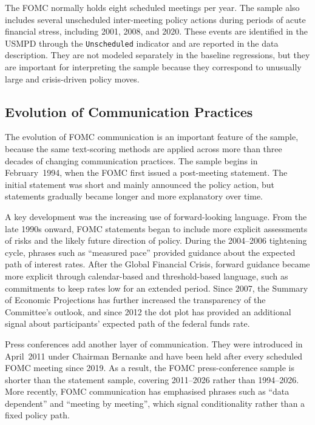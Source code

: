 The FOMC normally holds eight scheduled meetings per year. The sample
also includes several unscheduled inter-meeting policy actions during
periods of acute financial stress, including 2001, 2008, and 2020. These
events are identified in the USMPD through the \texttt{Unscheduled}
indicator and are reported in the data description. They are not modeled
separately in the baseline regressions, but they are important for
interpreting the sample because they correspond to unusually large and
crisis-driven policy moves.

\subsection{Evolution of Communication Practices}
\label{sec:inst_fomc_evolution}

The evolution of FOMC communication is an important feature of the
sample, because the same text-scoring methods are applied across more
than three decades of changing communication practices. The sample begins
in February~1994, when the FOMC first issued a post-meeting statement.
The initial statement was short and mainly announced the policy action,
but statements gradually became longer and more explanatory over time.

A key development was the increasing use of forward-looking language.
From the late 1990s onward, FOMC statements began to include more
explicit assessments of risks and the likely future direction of policy.
During the 2004--2006 tightening cycle, phrases such as ``measured
pace'' provided guidance about the expected path of interest rates. After
the Global Financial Crisis, forward guidance became more explicit
through calendar-based and threshold-based language, such as commitments
to keep rates low for an extended period. Since 2007, the Summary of
Economic Projections has further increased the transparency of the
Committee's outlook, and since 2012 the dot plot has provided an
additional signal about participants' expected path of the federal funds
rate.

Press conferences add another layer of communication. They were
introduced in April~2011 under Chairman Bernanke and have been held
after every scheduled FOMC meeting since 2019. As a result, the FOMC
press-conference sample is shorter than the statement sample, covering
2011--2026 rather than 1994--2026. More recently, FOMC communication has
emphasised phrases such as ``data dependent'' and ``meeting by meeting'',
which signal conditionality rather than a fixed policy path.

